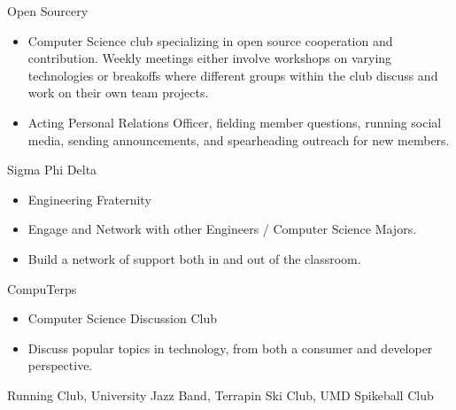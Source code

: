 \documentclass[11pt]{article}
\begin{document}
{\fontsize{10}{12}\robotocondlight
\noindent Open Sourcery
\begin{itemize}[noitemsep,nolistsep]
    \item Computer Science club specializing in open source cooperation and contribution. Weekly meetings either involve workshops on varying 
    technologies or breakoffs where different groups within the club discuss and work on their own team projects. 
    \item Acting Personal Relations Officer, fielding member questions, running social media, sending announcements, 
    and spearheading outreach for new members.
\end{itemize}
Sigma Phi Delta
\begin{itemize}[noitemsep,nolistsep]
    \item Engineering Fraternity
    \item Engage and Network with other Engineers / Computer Science Majors.
    \item Build a network of support both in and out of the classroom.
\end{itemize}
CompuTerps
\begin{itemize}[noitemsep,nolistsep]
    \item Computer Science Discussion Club
    \item Discuss popular topics in technology, from both a consumer and developer perspective. 
\end{itemize}
Running Club, University Jazz Band, Terrapin Ski Club, UMD Spikeball Club
}
\end{document}
